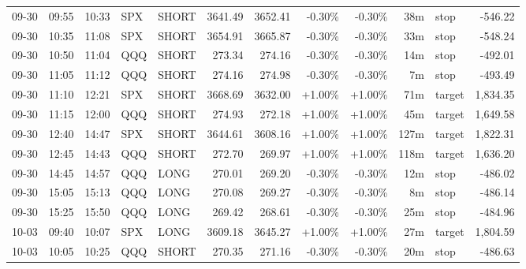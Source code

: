 \documentclass[11pt,a4paper,twoside]{article}
\begin{document}
\begin{center}
\begin{longtable}{>{\color{txtmain}}l l l l l r r r r r >{\color{txtmain}}l r}
09-30 & 09:55 & 10:33 & SPX & SHORT & 3641.49 & 3652.41 & \textcolor{lossred}{-0.30\%} & \textcolor{lossred}{-0.30\%} & 38m & stop & \textcolor{lossred}{-546.22} \\
09-30 & 10:35 & 11:08 & SPX & SHORT & 3654.91 & 3665.87 & \textcolor{lossred}{-0.30\%} & \textcolor{lossred}{-0.30\%} & 33m & stop & \textcolor{lossred}{-548.24} \\
09-30 & 10:50 & 11:04 & QQQ & SHORT & 273.34 & 274.16 & \textcolor{lossred}{-0.30\%} & \textcolor{lossred}{-0.30\%} & 14m & stop & \textcolor{lossred}{-492.01} \\
09-30 & 11:05 & 11:12 & QQQ & SHORT & 274.16 & 274.98 & \textcolor{lossred}{-0.30\%} & \textcolor{lossred}{-0.30\%} & 7m & stop & \textcolor{lossred}{-493.49} \\
09-30 & 11:10 & 12:21 & SPX & SHORT & 3668.69 & 3632.00 & \textcolor{wingreen}{+1.00\%} & \textcolor{wingreen}{+1.00\%} & 71m & target & \textcolor{wingreen}{1,834.35} \\
09-30 & 11:15 & 12:00 & QQQ & SHORT & 274.93 & 272.18 & \textcolor{wingreen}{+1.00\%} & \textcolor{wingreen}{+1.00\%} & 45m & target & \textcolor{wingreen}{1,649.58} \\
09-30 & 12:40 & 14:47 & SPX & SHORT & 3644.61 & 3608.16 & \textcolor{wingreen}{+1.00\%} & \textcolor{wingreen}{+1.00\%} & 127m & target & \textcolor{wingreen}{1,822.31} \\
09-30 & 12:45 & 14:43 & QQQ & SHORT & 272.70 & 269.97 & \textcolor{wingreen}{+1.00\%} & \textcolor{wingreen}{+1.00\%} & 118m & target & \textcolor{wingreen}{1,636.20} \\
09-30 & 14:45 & 14:57 & QQQ & LONG & 270.01 & 269.20 & \textcolor{lossred}{-0.30\%} & \textcolor{lossred}{-0.30\%} & 12m & stop & \textcolor{lossred}{-486.02} \\
09-30 & 15:05 & 15:13 & QQQ & LONG & 270.08 & 269.27 & \textcolor{lossred}{-0.30\%} & \textcolor{lossred}{-0.30\%} & 8m & stop & \textcolor{lossred}{-486.14} \\
09-30 & 15:25 & 15:50 & QQQ & LONG & 269.42 & 268.61 & \textcolor{lossred}{-0.30\%} & \textcolor{lossred}{-0.30\%} & 25m & stop & \textcolor{lossred}{-484.96} \\
10-03 & 09:40 & 10:07 & SPX & LONG & 3609.18 & 3645.27 & \textcolor{wingreen}{+1.00\%} & \textcolor{wingreen}{+1.00\%} & 27m & target & \textcolor{wingreen}{1,804.59} \\
10-03 & 10:05 & 10:25 & QQQ & SHORT & 270.35 & 271.16 & \textcolor{lossred}{-0.30\%} & \textcolor{lossred}{-0.30\%} & 20m & stop & \textcolor{lossred}{-486.63} \\

\end{longtable}
\end{center}
\end{document}
